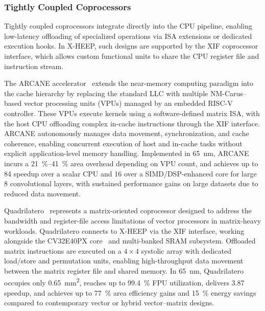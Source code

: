             \subsubsection*{Tightly Coupled Coprocessors}
            
                Tightly coupled coprocessors integrate directly into the CPU pipeline, enabling low-latency offloading of specialized operations via ISA extensions or dedicated execution hooks. In \mbox{X-HEEP}, such designs are supported by the XIF coprocessor interface, which allows custom functional units to share the CPU register file and instruction stream.
                
                The ARCANE accelerator~\cite{arcane} extends the near-memory computing paradigm into the cache hierarchy by replacing the standard LLC with multiple NM-Carus–based vector processing units (VPUs) managed by an embedded RISC-V controller. These VPUs execute kernels using a software-defined matrix ISA, with the host CPU offloading complex in-cache instructions through the XIF interface. ARCANE autonomously manages data movement, synchronization, and cache coherence, enabling concurrent execution of host and in-cache tasks without explicit application-level memory handling. Implemented in \SI{65}{\nano\meter}, ARCANE incurs a \SIrange{21}{41}{\percent} area overhead depending on VPU count, and achieves up to \SI{84}{\times} speedup over a scalar CPU and \SI{16}{\times} over a SIMD/DSP-enhanced core for large \SI{8}{\bit} convolutional layers, with sustained performance gains on large datasets due to reduced data movement.
                
                Quadrilatero~\cite{quadrilatero} represents a matrix-oriented coprocessor designed to address the bandwidth and register-file access limitations of vector processors in matrix-heavy workloads. Quadrilatero connects to \mbox{X-HEEP} via the XIF interface, working alongside the CV32E40PX core~\cite{ri5cy} and multi-banked SRAM subsystem. Offloaded matrix instructions are executed on a $4 \times 4$ systolic array with dedicated load/store and permutation units, enabling high-throughput data movement between the matrix register file and shared memory. In \SI{65}{\nano\meter}, Quadrilatero occupies only \SI{0.65}{\milli\meter\squared}, reaches up to \SI{99.4}{\percent} FPU utilization, delivers \SI{3.87}{\times} speedup, and achieves up to \SI{77}{\percent} area efficiency gains and \SI{15}{\percent} energy savings compared to contemporary vector or hybrid vector–matrix designs.


